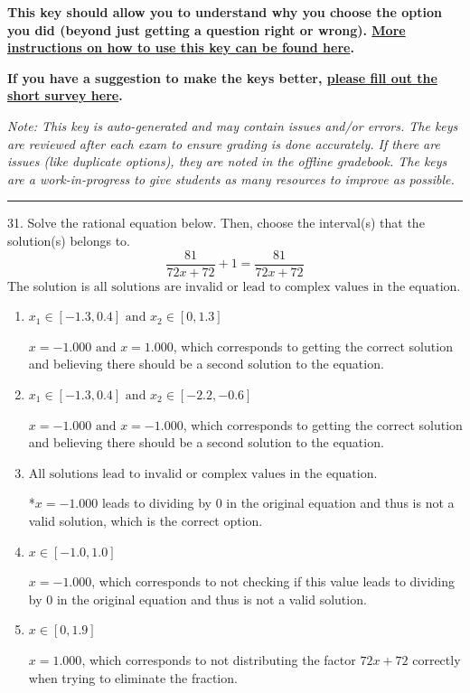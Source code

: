 \documentclass{article}[14pt]
\begin{document}
\textbf{This key should allow you to understand why you choose the option you did (beyond just getting a question right or wrong). \href{https://xronos.clas.ufl.edu/mac1105spring2020/courseDescriptionAndMisc/Exams/LearningFromResults}{More instructions on how to use this key can be found here}.}

\textbf{If you have a suggestion to make the keys better, \href{https://forms.gle/CZkbZmPbC9XALEE88}{please fill out the short survey here}.}

\textit{Note: This key is auto-generated and may contain issues and/or errors. The keys are reviewed after each exam to ensure grading is done accurately. If there are issues (like duplicate options), they are noted in the offline gradebook. The keys are a work-in-progress to give students as many resources to improve as possible.}

\rule{\textwidth}{0.4pt}

31. Solve the rational equation below. Then, choose the interval(s) that the solution(s) belongs to.
$$ \frac{81}{72x + 72} + 1 = \frac{81}{72x + 72} $$ 
The solution is $ \text{all solutions are invalid or lead to complex values in the equation.} $ 

\begin{enumerate}[label=\Alph*.] 
\item $ x_1 \in [-1.3, 0.4] \text{ and } x_2 \in [0,1.3] $ 

 $x = -1.000 \text{ and } x = 1.000$, which corresponds to getting the correct solution and believing there should be a second solution to the equation. 
\item $ x_1 \in [-1.3, 0.4] \text{ and } x_2 \in [-2.2,-0.6] $ 

 $x = -1.000 \text{ and } x = -1.000$, which corresponds to getting the correct solution and believing there should be a second solution to the equation. 
\item $ \text{All solutions lead to invalid or complex values in the equation.} $ 

 *$x = -1.000$ leads to dividing by 0 in the original equation and thus is not a valid solution, which is the correct option. 
\item $ x \in [-1.0,1.0] $ 

 $x = -1.000$, which corresponds to not checking if this value leads to dividing by 0 in the original equation and thus is not a valid solution. 
\item $ x \in [0,1.9] $ 

 $x = 1.000$, which corresponds to not distributing the factor $72x + 72$ correctly when trying to eliminate the fraction. 
\end{enumerate} 
 
\end{document}
